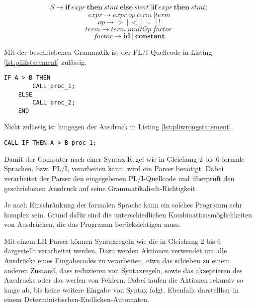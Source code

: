\begin{center}
	\begin{equation}\label{eqn:start}
		S \to \mathbf{if}\: expr\: \mathbf{then}\: stmt\: \mathbf{else}\: stmt\: | \mathbf{if}\: expr\: \mathbf{then}\: stmt;
	\end{equation}
	\begin{equation}
		expr \to expr\: op\: term\: | term
	\end{equation}
	\begin{equation}
		op \to \mathbf{>}\: |\: \mathbf{<}\: |\: \mathbf{=}\: |\: \mathbf{!}
	\end{equation}
	\begin{equation}
		term \to term\: multOp\: factor\:
	\end{equation}
	\begin{equation}
		factor \to \mathbf{id}\: |\: \mathbf{constant}
	\end{equation}
\end{center}

\pagebreak
Mit der beschriebenen Grammatik ist der PL/I-Quellcode in Listing \ref{lst:pliifstatement} zulässig.

\begin{lstlisting}[language=PL/I, caption=PL/I-Verzweigung, label={lst:pliifstatement}]
	IF A > B THEN
		CALL proc_1;
	ELSE
		CALL proc_2;
	END
\end{lstlisting}

Nicht zulässig ist hingegen der Ausdruck in Listing \ref{lst:pliwrongstatement}.

\begin{lstlisting}[language=PL/I, caption=Wrong Statement PL/I, label={lst:pliwrongstatement}]
	CALL IF THEN A > B proc_1;
\end{lstlisting}

Damit der Computer nach einer Syntax-Regel wie in Gleichung 2 bis 6 formale Sprachen, bzw. PL/I, verarbeiten kann, wird ein Parser benötigt. Dabei verarbeitet der Parser den eingegebenen PL/I-Quellcode und überprüft den geschriebenen Ausdruck auf seine Grammatikalisch-Richtigkeit.

Je nach Einschränkung der formalen Sprache kann ein solches Programm sehr komplex sein. Grund dafür sind die unterschiedlichen Kombinationsmöglichkeiten von Ausdrücken, die das Programm berücksichtigen muss.


Mit einem LR-Parser können Syntaxregeln wie die in Gleichung 2 bis 6 dargestellt verarbeitet werden.
Dazu werden Aktionen verwendet um alle  Ausdrücke eines Eingabecodes zu verarbeiten, etwa das schieben zu einem anderen Zustand, dass reduzieren von Syntaxregeln, sowie das akzeptieren des Ausdrucks oder das werfen von Fehlern.
Dabei laufen die Aktionen rekursiv so lange ab, bis keine  weitere Eingabe von Syntax folgt.
Ebenfalls darstellbar in einem Deterministischen-Endlichen-Automaten.

